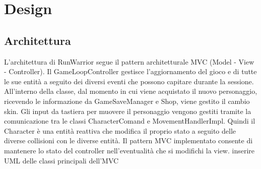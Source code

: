 \documentclass[a4paper,12pt]{report}
\begin{document}
\chapter{Design}
\section{Architettura}
L'architettura di RunWarrior segue il pattern architetturale MVC (Model - View - Controller). Il GameLoopController gestisce l'aggiornamento
del gioco e di tutte le sue entità a seguito dei diversi eventi che possono capitare durante la sessione. All'interno della classe, 
dal momento in cui viene acquistato il nuovo personaggio, ricevendo le informazione da GameSaveManager e Shop, viene gestito il cambio skin.
Gli input da tastiera per muovere il personaggio vengono gestiti tramite la comunicazione tra le classi CharacterComand e MovementHandlerImpl.
Quindi il Character è una entità reattiva che modifica il proprio stato a seguito delle diverse collisioni con le diverse entità.
Il pattern MVC implementato consente di mantenere lo stato del controller nell'eventualità che si modifichi la view.
inserire UML delle classi principali dell'MVC
\end{document}
